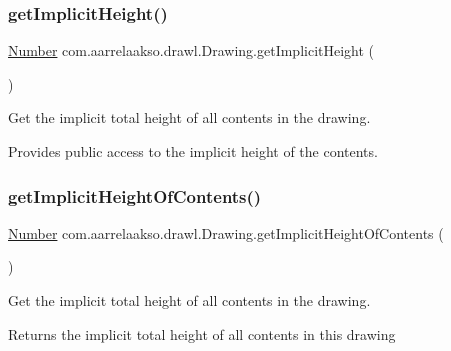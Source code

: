 \subsubsection{\texorpdfstring{get\+Implicit\+Height()}{getImplicitHeight()}}
{\footnotesize\ttfamily \hyperlink{interfacecom_1_1aarrelaakso_1_1drawl_1_1_number}{Number} com.\+aarrelaakso.\+drawl.\+Drawing.\+get\+Implicit\+Height (\begin{DoxyParamCaption}{ }\end{DoxyParamCaption})\hspace{0.3cm}{\ttfamily [private]}}



Get the implicit total height of all contents in the drawing. 

Provides public access to the implicit height of the contents. \mbox{\label{classcom_1_1aarrelaakso_1_1drawl_1_1_drawing_a50786a75c6ca4f30ab752d276a23c1c4}} 
\subsubsection{\texorpdfstring{get\+Implicit\+Height\+Of\+Contents()}{getImplicitHeightOfContents()}}
{\footnotesize\ttfamily \hyperlink{interfacecom_1_1aarrelaakso_1_1drawl_1_1_number}{Number} com.\+aarrelaakso.\+drawl.\+Drawing.\+get\+Implicit\+Height\+Of\+Contents (\begin{DoxyParamCaption}{ }\end{DoxyParamCaption})\hspace{0.3cm}{\ttfamily [private]}}



Get the implicit total height of all contents in the drawing. 

\begin{DoxyReturn}{Returns}
the implicit total height of all contents in this drawing 
\end{DoxyReturn}
\mbox{\label{classcom_1_1aarrelaakso_1_1drawl_1_1_drawing_a67991c78d1f4989b0422b6cc36d339fe}} 

